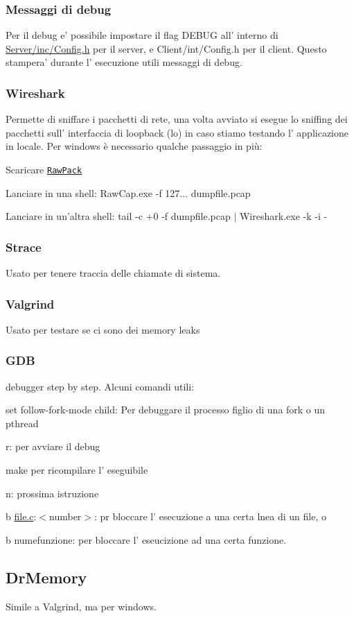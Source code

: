 \subsubsection*{Messaggi di debug}

Per il debug e' possibile impostare il flag D\+E\+B\+U\+G all' interno di \hyperlink{Server_2inc_2Config_8h}{Server/inc/\+Config.\+h} per il server, e Client/int/\+Config.\+h per il client. Questo stampera' durante l' esecuzione utili messaggi di debug.

\subsubsection*{Wireshark}

Permette di sniffare i pacchetti di rete, una volta avviato si esegue lo sniffing dei pacchetti sull' interfaccia di loopback (lo) in caso stiamo testando l' applicazione in locale. Per windows è necessario qualche passaggio in più\+:
\begin{DoxyEnumerate}
\item Scaricare \href{http://www.netresec.com/?page=RawCap}{\tt Raw\+Pack}
\item Lanciare in una shell\+: {\ttfamily Raw\+Cap.\+exe -\/f 127... dumpfile.\+pcap}
\item Lanciare in un'altra shell\+: {\ttfamily tail -\/c +0 -\/f dumpfile.\+pcap $\vert$ Wireshark.\+exe -\/k -\/i -\/}
\end{DoxyEnumerate}

\subsubsection*{Strace}

Usato per tenere traccia delle chiamate di sistema.

\subsubsection*{Valgrind}

Usato per testare se ci sono dei memory leaks

\subsubsection*{G\+D\+B}

debugger step by step. Alcuni comandi utili\+:


\begin{DoxyItemize}
\item {\ttfamily set follow-\/fork-\/mode child}\+: Per debuggare il processo figlio di una fork o un pthread
\item {\ttfamily r}\+: per avviare il debug
\item {\ttfamily make} per ricompilare l' eseguibile
\item {\ttfamily n}\+: prossima istruzione
\item {\ttfamily b \hyperlink{file_8c}{file.\+c}\+:$<$number$>$}\+: pr bloccare l' esecuzione a una certa lnea di un file, o
\item {\ttfamily b numefunzione}\+: per bloccare l' eseucizione ad una certa funzione.
\end{DoxyItemize}

\subsection*{Dr\+Memory}

Simile a Valgrind, ma per windows. 